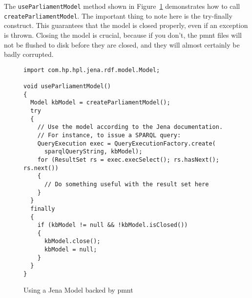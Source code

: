 The \verb|useParliamentModel| method shown in Figure~\ref{figure-using-jena-model} demonstrates how to call \verb|createParliamentModel|.  The important thing to note here is the try-finally construct.  This guarantees that the model is closed properly, even if an exception is thrown.  Closing the model is crucial, because if you don't, the \ac{pmnt} files will not be flushed to disk before they are closed, and they will almost certainly be badly corrupted.

	\begin{figure}[htbp]
		\footnotesize
		\centering
		\begin{verbatim}
import com.hp.hpl.jena.rdf.model.Model;

void useParliamentModel()
{
  Model kbModel = createParliamentModel();
  try
  {
    // Use the model according to the Jena documentation.
    // For instance, to issue a SPARQL query:
    QueryExecution exec = QueryExecutionFactory.create(
      sparqlQueryString, kbModel);
    for (ResultSet rs = exec.execSelect(); rs.hasNext(); rs.next())
    {
      // Do something useful with the result set here
    }
  }
  finally
  {
    if (kbModel != null && !kbModel.isClosed())
    {
      kbModel.close();
      kbModel = null;
    }
  }
}
		\end{verbatim}
		\caption{Using a Jena Model backed by \ac{pmnt}}
		\label{figure-using-jena-model}
	\end{figure}

